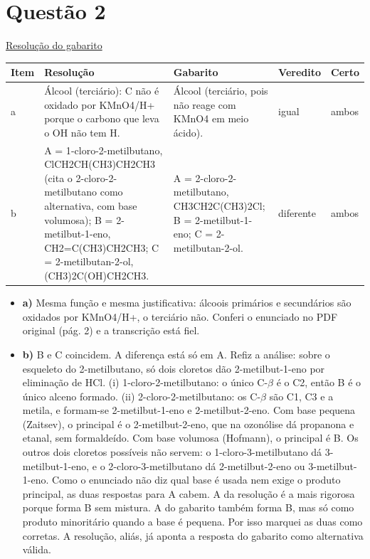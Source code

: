 \documentclass{article}%
\begin{document}
\section*{Questão 2}%
\href{https://poliedroresolve.sistemapoliedro.com.br/vestibulares/ime/2026/ime-2-fase-dia-3-25-10-2025-2-fase-dia-3/dissertativa-2-quimica-2-fase-dia-3-ime-2026}{Resolução do gabarito}\par\smallskip%
\begin{longtable}{@{}p{} p{} p{} p{} p{}@{}}\toprule Item & Resolução & Gabarito & Veredito & Certo \\ \midrule
a & Álcool (terciário): C não é oxidado por KMnO4/H+ porque o carbono que leva o OH não tem H. & Álcool (terciário, pois não reage com KMnO4 em meio ácido). & igual & ambos \\
b & A = 1{-}cloro{-}2{-}metilbutano, ClCH2CH(CH3)CH2CH3 (cita o 2{-}cloro{-}2{-}metilbutano como alternativa, com base volumosa); B = 2{-}metilbut{-}1{-}eno, CH2=C(CH3)CH2CH3; C = 2{-}metilbutan{-}2{-}ol, (CH3)2C(OH)CH2CH3. & A = 2{-}cloro{-}2{-}metilbutano, CH3CH2C(CH3)2Cl; B = 2{-}metilbut{-}1{-}eno; C = 2{-}metilbutan{-}2{-}ol. & diferente & ambos \\
\bottomrule\end{longtable}%
\begin{itemize}%
\item%
\textbf{a)} Mesma função e mesma justificativa: álcoois primários e secundários são oxidados por KMnO4/H+, o terciário não. Conferi o enunciado no PDF original (pág. 2) e a transcrição está fiel.%
\item%
\textbf{b)} B e C coincidem. A diferença está só em A. Refiz a análise: sobre o esqueleto do 2{-}metilbutano, só dois cloretos dão 2{-}metilbut{-}1{-}eno por eliminação de HCl. (i) 1{-}cloro{-}2{-}metilbutano: o único C{-}$\beta$ é o C2, então B é o único alceno formado. (ii) 2{-}cloro{-}2{-}metilbutano: os C{-}$\beta$ são C1, C3 e a metila, e formam{-}se 2{-}metilbut{-}1{-}eno e 2{-}metilbut{-}2{-}eno. Com base pequena (Zaitsev), o principal é o 2{-}metilbut{-}2{-}eno, que na ozonólise dá propanona e etanal, sem formaldeído. Com base volumosa (Hofmann), o principal é B. Os outros dois cloretos possíveis não servem: o 1{-}cloro{-}3{-}metilbutano dá 3{-}metilbut{-}1{-}eno, e o 2{-}cloro{-}3{-}metilbutano dá 2{-}metilbut{-}2{-}eno ou 3{-}metilbut{-}1{-}eno. Como o enunciado não diz qual base é usada nem exige o produto principal, as duas respostas para A cabem. A da resolução é a mais rigorosa porque forma B sem mistura. A do gabarito também forma B, mas só como produto minoritário quando a base é pequena. Por isso marquei as duas como corretas. A resolução, aliás, já aponta a resposta do gabarito como alternativa válida.%
\end{itemize}%
\end{document}
